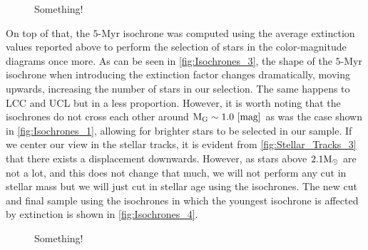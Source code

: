 \begin{figure}[!ht]
\centering
\caption{\scriptsize{Something!}}
\label{fig:SCOCEN_Extinction}
\end{figure}

On top of that, the $5$-Myr isochrone was computed using the average extinction values reported above to perform the selection of stars in the color-magnitude diagrams once more. As can be seen in \autoref{fig:Isochrones_3}, the shape of the $5$-Myr isochrone when introducing the extinction factor changes dramatically, moving upwards, increasing the number of stars in our selection. The same happens to LCC and UCL but in a less proportion. However, it is worth noting that the isochrones do not cross each other around $\textnormal{M}_\textnormal{G} \sim 1.0~[\textnormal{mag}]$ as was the case shown in \autoref{fig:Isochrones_1}, allowing for brighter stars to be selected in our sample. If we center our view in the stellar tracks, it is evident from \autoref{fig:Stellar_Tracks_3} that there exists a displacement downwards. However, as stars above $2.1 \textnormal{M}_\odot$ are not a lot, and this does not change that much, we will not perform any cut in stellar mass but we will just cut in stellar age using the isochrones. The new cut and final sample using the isochrones in which the youngest isochrone is affected by extinction is shown in \autoref{fig:Isochrones_4}.\\ 

\begin{figure}[!ht]
\centering
\caption{\scriptsize{Something!}}
\label{fig:Stellar_Tracks_3}
\end{figure}

